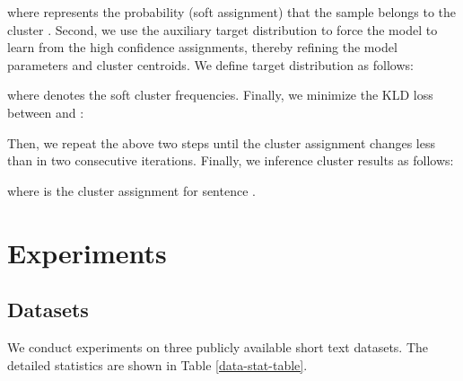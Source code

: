 \documentclass[letterpaper]{article} \usepackage{aaai20}  \usepackage{times}  \usepackage{helvet} \usepackage{courier}  \usepackage[hyphens]{url}  \usepackage{graphicx} \urlstyle{rm} \def\UrlFont{\rm}  \usepackage{graphicx}  \frenchspacing  \setlength{\pdfpagewidth}{8.5in}  \setlength{\pdfpageheight}{11in}
\begin{document}
where  represents the probability (soft assignment) that the sample  belongs to the cluster . Second, we use the auxiliary target distribution  to force the model to learn from the high confidence assignments, thereby refining the model parameters and cluster centroids. We define target distribution  as follows:

where  denotes the soft cluster frequencies. Finally, we minimize the KLD loss between  and :

Then, we repeat the above two steps until the cluster assignment changes less than  in two consecutive iterations. Finally, we inference cluster  results as follows:

where  is the cluster assignment for sentence .


\section{Experiments}
\subsection{Datasets}
We conduct experiments on three publicly available short text datasets. The detailed statistics are shown in Table \ref{data-stat-table}.
\end{document}
